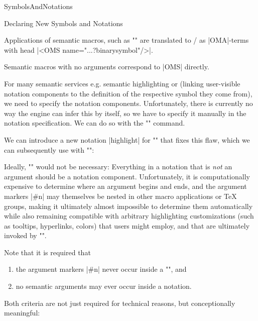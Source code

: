 \begin{smodule}[ns=https://github.com/slatex/sTeX/doc]{SymbolsAndNotations}
\begin{sfragment}{Declaring New Symbols and Notations}
    \begin{mmtbox}
        Applications of semantic macros, such as 
        \stexcode"" are translated to \mmt/\omdoc
        as |OMA|-terms with head |<OMS name="...?binarysymbol"/>|.

        Semantic macros with no arguments correspond to
        |OMS| directly.
    \end{mmtbox}

    \begin{function}{\comp}
      For many semantic services e.g. semantic highlighting or 
      (linking user-visible notation components to the definition of the respective symbol
      they come from), we need to specify the notation components. Unfortunately, there is
      currently no way the \sTeX engine can infer this by itself, so we have to specify it
      manually in the notation specification.  We can do so with the \stexcode"\comp"
      command.
    \end{function}

    We can introduce a new notation |highlight| for 
    \stexcode"\binarysymbol" that fixes this flaw, which we can
    subsequently use with \stexcode"\binarysymbol[highlight]":


    \begin{dangerbox}
        Ideally, \stexcode"\comp" would not be necessary: Everything
        in a notation that is \emph{not} an argument should be a notation
        component. Unfortunately, it is computationally expensive
        to determine where an argument begins and ends, and
        the argument markers |#n| may themselves be nested in other macro applications
        or \TeX\xspace groups,
        making it ultimately almost impossible to determine them automatically
        while also remaining compatible with arbitrary highlighting customizations
        (such as tooltips, hyperlinks, colors) that users might employ, and
        that are ultimately invoked by \stexcode"\comp".
    \end{dangerbox}
    \begin{dangerbox}
        Note that it is required that 
        \begin{enumerate}
            \item the argument markers |#n| never occur inside a \stexcode"\comp", and
            \item no semantic arguments may ever occur inside a notation.
        \end{enumerate}
        Both criteria are not just required for technical reasons,
        but conceptionally meaningful: 
        

\end{dangerbox}
\end{sfragment}
\end{smodule}
